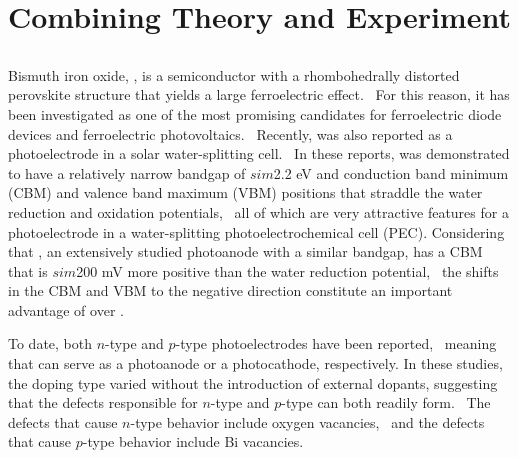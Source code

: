 
\section{Combining Theory and Experiment}

\subsection{}

Bismuth iron oxide, , is a semiconductor with a rhombohedrally distorted perovskite structure that yields a large ferroelectric effect.~\cite{choi2009switchable} For this reason, it has been investigated as one of the most promising candidates for ferroelectric diode devices and ferroelectric photovoltaics.~\cite{choi2009switchable,yi2011mechanism,you2018enhancing,spanier2016power} Recently,  was also reported as a photoelectrode in a solar water-splitting cell.~\cite{shen2017dual,yilmaz2016perovskite,moniz2015visible,song2018domain,liu2016enhanced} In these reports,  was demonstrated to have a relatively narrow bandgap of $sim$2.2 eV and conduction band minimum (CBM) and valence band maximum (VBM) positions that straddle the water reduction and oxidation potentials,~\cite{shen2017dual,yilmaz2016perovskite} all of which are very attractive features for a photoelectrode in a water-splitting photoelectrochemical cell (PEC). Considering that , an extensively studied photoanode with a similar bandgap, has a CBM that is $sim$200 mV more positive than the water reduction potential,~\cite{sivula2016semiconducting} the shifts in the CBM and VBM to the negative direction constitute an important advantage of  over .~\cite{lee2019progress}

To date, both $n$-type and $p$-type  photoelectrodes have been reported,~\cite{shen2017dual,yilmaz2016perovskite,moniz2015visible,song2018domain,liu2016enhanced} meaning that  can serve as a photoanode or a photocathode, respectively. In these studies, the doping type varied without the introduction of external dopants, suggesting that the defects responsible for $n$-type and $p$-type  can both readily form.~\cite{lee2019progress} The defects that cause $n$-type behavior include oxygen vacancies,~\cite{paudel2012intrinsic} and the defects that cause $p$-type behavior include Bi vacancies.~\cite{rojac2017domain}

